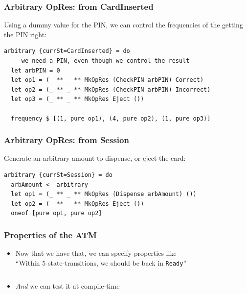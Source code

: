 \documentclass[compress,handout]{beamer}
\begin{document}
\begin{frame}[fragile]
  \frametitle{Arbitrary OpRes: from CardInserted}

  Using a dummy value for the PIN, we can control the frequencies of the getting
  the PIN right:

  \begin{verbatim}
arbitrary {currSt=CardInserted} = do
  -- we need a PIN, even though we control the result
  let arbPIN = 0
  let op1 = (_ ** _ ** MkOpRes (CheckPIN arbPIN) Correct)
  let op2 = (_ ** _ ** MkOpRes (CheckPIN arbPIN) Incorrect)
  let op3 = (_ ** _ ** MkOpRes Eject ())

  frequency $ [(1, pure op1), (4, pure op2), (1, pure op3)]
  \end{verbatim}

\end{frame}


\begin{frame}[fragile]
  \frametitle{Arbitrary OpRes: from Session}

  Generate an arbitrary amount to dispense, or eject the card:

  \begin{verbatim}
arbitrary {currSt=Session} = do
  arbAmount <- arbitrary
  let op1 = (_ ** _ ** MkOpRes (Dispense arbAmount) ())
  let op2 = (_ ** _ ** MkOpRes Eject ())
  oneof [pure op1, pure op2]
  \end{verbatim}

\end{frame}


\begin{frame}
  \frametitle{Properties of the ATM}

  \begin{itemize}
    \item<1-> Now that we have that, we can specify properties like\\
              ``Within 5 state-transitions, we should be back in
              \texttt{Ready}''
              \vspace*{-1mm}
              \inputminted{Idris}{qc-things/ATM-props.idr}
    \item<2-> \textit{And} we can test it at compile-time
              \vspace*{-1mm}
              \inputminted{Idris}{qc-things/ATM-qc-props.idr}
              \vspace*{-3mm}
  \end{itemize}

\end{frame}
\end{document}
